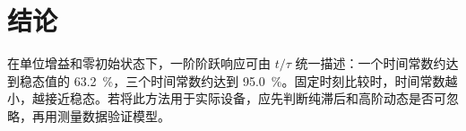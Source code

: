\section{结论}

在单位增益和零初始状态下，一阶阶跃响应可由 $t/\tau$ 统一描述：一个时间常数约达到稳态值的 \qty{63.2}{\percent}，三个时间常数约达到 \qty{95.0}{\percent}。固定时刻比较时，时间常数越小，越接近稳态。若将此方法用于实际设备，应先判断纯滞后和高阶动态是否可忽略，再用测量数据验证模型。

